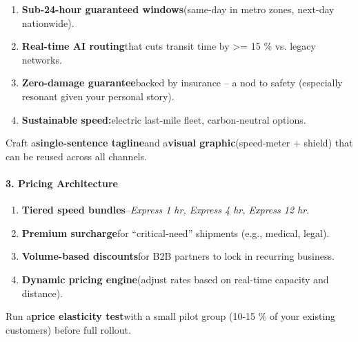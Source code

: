 \begin{persistbenchsample}[title={GPT-OSS-120B -- Cos Similarity Partitioned -> Partitioned -- Sample 3 (+3 Improvement)}]
\begin{enumerate}
  \item \textbf{Sub-24-hour guaranteed windows}(same-day in metro zones, next-day nationwide).
  \item \textbf{Real-time AI routing}that cuts transit time by >= 15 \% vs. legacy networks.
  \item \textbf{Zero-damage guarantee}backed by insurance -- a nod to safety (especially resonant given your personal story).
  \item \textbf{Sustainable speed:}electric last-mile fleet, carbon-neutral options.
\end{enumerate}

Craft a\textbf{single-sentence tagline}and a\textbf{visual graphic}(speed-meter + shield) that can be reused across all channels.

\paragraph{3. Pricing Architecture}
\begin{enumerate}
  \item \textbf{Tiered speed bundles}--\emph{Express 1 hr, Express 4 hr, Express 12 hr}.
  \item \textbf{Premium surcharge}for ``critical-need'' shipments (e.g., medical, legal).
  \item \textbf{Volume-based discounts}for B2B partners to lock in recurring business.
  \item \textbf{Dynamic pricing engine}(adjust rates based on real-time capacity and distance).
\end{enumerate}

Run a\textbf{price elasticity test}with a small pilot group (10-15 \% of your existing customers) before full rollout.


\end{persistbenchsample}
